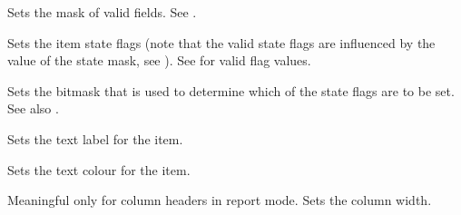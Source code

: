 
Sets the mask of valid fields. See
.

\label{wxlistitemsetstate}


Sets the item state flags (note that the valid state flags are influenced
by the value of the state mask, see
).
See  for valid flag
values.

\label{wxlistitemsetstatemask}


Sets the bitmask that is used to determine which of the state flags
are to be set. See also .

\label{wxlistitemsettext}


Sets the text label for the item.

\label{wxlistitemsettextcolour}


Sets the text colour for the item.

\label{wxlistitemsetwidth}


Meaningful only for column headers in report mode. Sets the column width.

